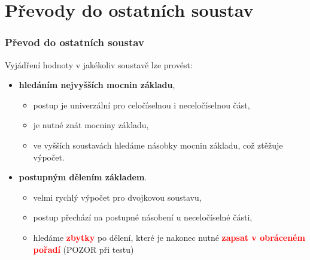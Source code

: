 \section{\texorpdfstring{Převody do ostatních soustav}{Prevody do ostatnich soustav}}

  \begin{frame}
    \frametitle{Převod do ostatních soustav}
    Vyjádření hodnoty v jakékoliv soustavě lze provést:
    
    
    \begin{itemize}
      \item \textbf{hledáním nejvyšších mocnin základu},
      
      \begin{itemize}
        \item postup je univerzální pro celočíselnou i neceločíselnou část,
        \item je nutné znát mocniny základu,
        \item ve vyšších soustavách hledáme násobky mocnin základu, což ztěžuje výpočet. 
      \end{itemize}
      
      \item \textbf{postupným dělením základem}.
      
      \begin{itemize}
        \item velmi rychlý výpočet pro dvojkovou soustavu,
        \item postup přechází na postupné násobení u neceločíselné části,
        \item hledáme \textcolor{red}{\textbf{zbytky}} po dělení, které je nakonec nutné \textcolor{red}{\textbf{zapsat v obráceném pořadí}} (POZOR při testu)
      \end{itemize}
      
    \end{itemize}
		
	\end{frame}
  
